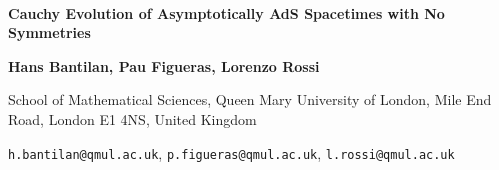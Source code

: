 \documentclass[a4paper,11pt]{article}
\numberwithin{equation}{section}
\begin{document}
 \begin{titlepage}

\thispagestyle{empty}

$\,$


\vspace{40pt}  
	 
\begin{center}

{\huge \textbf{Cauchy Evolution of Asymptotically AdS Spacetimes with No Symmetries}}

\vspace{30pt}
		
{\large \bf Hans Bantilan, Pau Figueras,  Lorenzo Rossi}
		

\vspace{25pt}


{\normalsize  
School of Mathematical Sciences, Queen Mary University of London, Mile End Road, London E1 4NS, United Kingdom}

\vspace{10pt}
\texttt{h.bantilan@qmul.ac.uk}, \texttt{p.figueras@qmul.ac.uk}, \texttt{l.rossi@qmul.ac.uk}


\vspace{40pt}
				

\end{center}
\end{titlepage}
\end{document}
